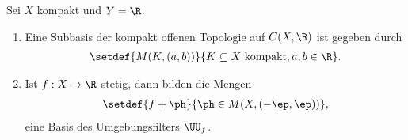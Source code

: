 \begin{prop}[Probleme]
\label{prop:2.3.17}
Sei $X$ kompakt und $Y=\R$.
\begin{enumerate}
  \item Eine Subbasis der kompakt offenen Topologie auf $C(X,\R)$ ist gegeben
  durch
  \begin{align*}
   \setdef{M(K,(a,b))}{K\subseteq X\text{ kompakt}, a,b\in\R}.
  \end{align*}
\item Ist $f:X\to\R$ stetig, dann bilden die Mengen
\begin{align*}
\setdef{f+\ph}{\ph\in M(X,(-\ep,\ep))},
\end{align*}
eine Basis des Umgebungsfilters $\UU_f$.\fishhere
\end{enumerate}
\end{prop}

